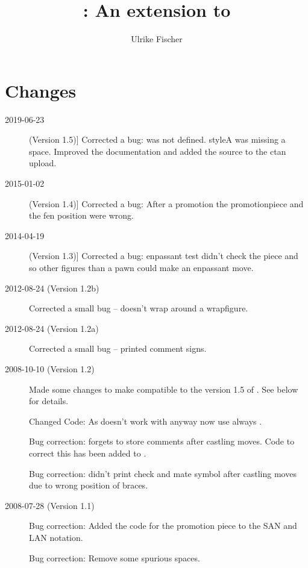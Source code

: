 \documentclass[pagesize,parskip=half-,fontsize=12pt]{scrartcl}
\begin{document}
\title{: An extension to \skaksty}
\author{Ulrike Fischer}
\maketitle

\tableofcontents

\section{Changes}
\begin{description}
\item[2019-06-23] (Version 1.5)] Corrected a bug:  was not defined. styleA was missing a space. Improved the documentation and added the source to the ctan upload.
    
\item[2015-01-02] (Version 1.4)] Corrected a bug: After a promotion the promotionpiece and the fen position were wrong.
\item[2014-04-19] (Version 1.3)] Corrected a bug: enpassant test didn't check the piece and so other figures than a pawn could make an enpassant move.
\item[2012-08-24 (Version 1.2b)]
Corrected a small bug --  doesn't wrap around a wrapfigure.


\item[2012-08-24 (Version 1.2a)]
Corrected a small bug --  printed comment signs.

\item[2008-10-10 (Version 1.2)]
Made some changes to make \xskak compatible to the version 1.5 of
\skaksty. See below for details.

Changed Code: As  doesn't work with 
anyway  now use always .

Bug correction: \skaksty forgets to store comments after castling
moves. Code to correct this has been added to \xskak.

Bug correction: \xskak didn't print check and mate symbol after
castling moves due to wrong position of braces.

\item[2008-07-28 (Version 1.1)]
Bug correction: Added the code for the promotion piece to the SAN and
LAN notation.

Bug correction: Remove some spurious spaces.

\end{description}
\end{document}
